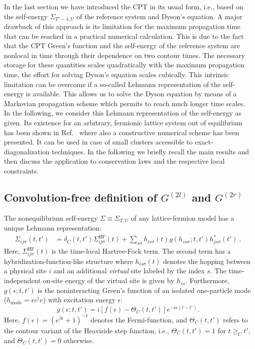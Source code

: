 \documentclass[twocolumn,prb,showpacs,aps,superscriptaddress]{revtex4}
\newcommand{\cds}[1]{\ensuremath{c^\dagger_{#1}}}
\newcommand{\ccs}[1]{\ensuremath{c_{#1}}}
\begin{document}
In the last section we have introduced the CPT in its usual form, i.e., based
on the self-energy $\Sigma_{T'-\lambda, U}$ of the reference system and Dyson's
equation. A major drawback of this approach is its limitation for the maximum
propagation time that can be reached in a practical numerical calculation. This
is due to the fact that the CPT Green's function and the self-energy of the
reference system are nonlocal in time through their dependence on two contour
times.  The necessary storage for these quantities scales quadratically with
the maximum propagation time, the effort for solving Dyson's equation scales
cubically.  This intrinsic limitation can be overcome if a so-called
Lehmann representation of the self-energy is available. This allows
us to solve the Dyson equation by means of a Markovian propagation scheme which
permits to reach much longer time scales. \cite{BE14,GP15} In the
following, we consider this Lehmann representation of the self-energy as given.
Its existence for an arbitrary, fermionic lattice system out of equilibrium has
been shown in Ref.\  where also a constructive numerical
scheme has been presented. It can be used in case of small clusters
accessible to exact-diagonalization techniques. In the following we briefly
recall the main results and then discuss the application to conservation laws
and the respective local constraints.

\subsection{Convolution-free definition of $G^{(2l)}$ and $G^{(2r)}$}

The nonequilibrium self-energy $\Sigma \equiv \Sigma_{T, U}$ of any
lattice-fermion model has a unique Lehmann representation: \cite{GP15}
\begin{align}
  \label{sig:leh}
  \Sigma_{ij\sigma}(t,t')
  &=
  \delta_C(t,t') \Sigma^\mathrm{HF}_{ij\sigma}(t)
  + 
  \sum_{s\sigma} h_{is\sigma}(t) g(h_{ss\sigma};t,t') h^*_{js\sigma}(t') \: .
\end{align}
Here, $\Sigma_{ij\sigma}^\mathrm{HF}(t)$ is the time-local Hartree-Fock term.
The second term has a hybridization-function-like structure \cite{GBEK13,
BE14} where $h_{is\sigma}(t)$ denotes the hopping between a physical site
$i$ and an additional \emph{virtual} site labeled by the index $s$. The
time-independent on-site energy of the virtual site is given by $h_{ss}$.
Furthermore, $g(\epsilon;t,t')$ is the noninteracting Green's function of an
isolated one-particle mode ($h_\mathrm{mode} = \epsilon \cds{}\ccs{}$) with
excitation energy $\epsilon$:
\begin{equation}
  \label{eq:isolated}
  g(\epsilon;t,t')=i[f(\epsilon)-\Theta_C(t,t')] e^{-i\epsilon(t-t')}.
\end{equation}
Here, $f(\epsilon)=(e^{\beta \epsilon}+1)^{-1}$ denotes the Fermi-function,
and $\Theta_C(t,t')$ refers to the contour variant of the Heaviside step
function, i.e., $\Theta_C(t,t')=1$ for $t\ge_Ct'$, and $\Theta_C(t,t')=0$
otherwise.
\end{document}
